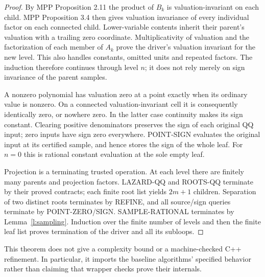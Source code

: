 \documentclass[11pt]{article}
\theoremstyle{definition}
\begin{document}
\begin{proof}
By MPP Proposition 2.11 the product of $B_k$ is valuation-invariant on each child.
MPP Proposition 3.4 then gives valuation invariance of every individual factor on
each connected child. Lower-variable contents inherit their parent's valuation
with a trailing zero coordinate. Multiplicativity of valuation and the
factorization of each member of $A_k$ prove the driver's valuation invariant for
the new level. This also handles constants, omitted units and repeated factors.
The induction therefore continues through level $n$; it does not rely merely on
sign invariance of the parent samples.

A nonzero polynomial has valuation zero at a point exactly when its ordinary
value is nonzero. On a connected valuation-invariant cell it is consequently
identically zero, or nowhere zero. In the latter case continuity makes its sign
constant. Clearing positive denominators preserves the sign of each original
QQ input; zero inputs have sign zero everywhere. POINT-SIGN evaluates the original
input at its certified sample, and hence stores the sign of the whole leaf.
For $n=0$ this is rational constant evaluation at the sole empty leaf.

Projection is a terminating trusted operation. At each level there are finitely
many parents and projection factors. LAZARD-QQ and ROOTS-QQ terminate by their
proved contracts; each finite root list yields $2m+1$ children. Separation of two
distinct roots terminates by REFINE, and all source/sign queries terminate by
POINT-ZERO/SIGN. SAMPLE-RATIONAL terminates by Lemma~\ref{l:sampling}.
Induction over the finite number of levels and then the finite
leaf list proves termination of the driver and all its subloops.
\end{proof}
This theorem does not give a complexity bound or a machine-checked C++ refinement.
In particular, it imports the baseline algorithms' specified behavior rather than
claiming that wrapper checks prove their internals.
\end{document}
